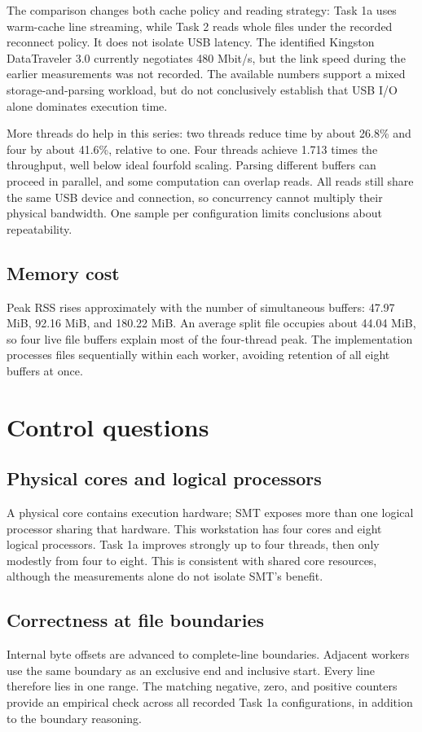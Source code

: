 \documentclass{../latex/utmreport}
\begin{document}
The comparison changes both cache policy and reading strategy: Task 1a uses
warm-cache line streaming, while Task 2 reads whole files under the recorded
reconnect policy. It does not isolate USB latency. The identified Kingston
DataTraveler 3.0 currently negotiates 480 Mbit/s, but the link speed during the
earlier measurements was not recorded. The available numbers support a mixed
storage-and-parsing workload, but do not conclusively establish that USB I/O
alone dominates execution time.

More threads do help in this series: two threads reduce time by about 26.8\%
and four by about 41.6\%, relative to one. Four threads achieve 1.713 times the
throughput, well below ideal fourfold scaling. Parsing different buffers can
proceed in parallel, and some computation can overlap reads. All reads still
share the same USB device and connection, so concurrency cannot multiply their
physical bandwidth. One sample per configuration limits conclusions about
repeatability.

\section{Memory cost}
Peak RSS rises approximately with the number of simultaneous buffers:
47.97 MiB, 92.16 MiB, and 180.22 MiB. An average split file occupies about
44.04 MiB, so four live file buffers explain most of the four-thread peak.
The implementation processes files sequentially within each worker, avoiding
retention of all eight buffers at once.

\chapter{Control questions}
\section{Physical cores and logical processors}
A physical core contains execution hardware; SMT exposes more than one logical
processor sharing that hardware. This workstation has four cores and eight
logical processors. Task 1a improves strongly up to four threads, then only
modestly from four to eight. This is consistent with shared core resources,
although the measurements alone do not isolate SMT's benefit.

\section{Correctness at file boundaries}
Internal byte offsets are advanced to complete-line boundaries. Adjacent
workers use the same boundary as an exclusive end and inclusive start.
Every line therefore lies in one range. The matching negative, zero, and
positive counters provide an empirical check across all recorded Task 1a
configurations, in addition to the boundary reasoning.
\end{document}
